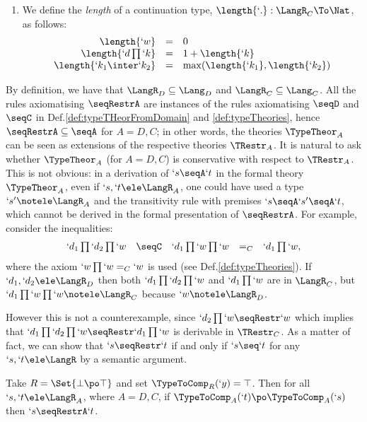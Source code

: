 \documentclass{lmcs}
\def\Steffen#1{}\def\Ugo#1{}\def\Franco#1{}
\begin{document}
\begin{defi}
\begin{enumerate}
 \item
We define the \emph{length} of a continuation type, $ \length{`.} : \LangR_C \To \Nat$, as follows:
%
 \[ \begin{array}{rcl}
\length{`w} &=& 0 \\ 
\length{`d\prod `k} &=& 1+ \length{`k} \\ 
\length{`k_1 \inter`k_2} &=& \max (\length{`k_1} , \length{`k_2})
 \end{array} \]
 \Ugo{Where length is used? I have put this part into comment}
\Steffen{In Theorem {thm:typableAreSN}; a simple find reveals this.}
 \end{enumerate}
 \end{defi}

By definition, we have that $\LangR_D \subseteq \Lang_D$ and $\LangR_C \subseteq \Lang_C$. 
All the rules axiomatising $\seqRestrA$ are instances of the rules axiomatising $\seqD$ and $\seqC$ in Def.\skp\ref{def:typeTHeorFromDomain} and \ref{def:typeTheories}, 
hence ${\seqRestrA} \subseteq {\seqA}$ for $A=D,C$; in other words, the theories $\TypeTheor_A$ can be seen as extensions of the respective theories $\TRestr_A$. 
It is natural to ask whether $\TypeTheor_A$ (for $A=D,C$) is conservative with respect to $\TRestr_A$.
This is not obvious: in a derivation of $`s \seqA `t$ in the formal theory $\TypeTheor_A$, even if $`s,`t \ele \LangR_A$, one could have used a type $`s'\notele \LangR_A$ and the transitivity rule with premises $`s\seqA`s'\seqA`t$, which cannot be derived in the formal presentation of $\seqRestrA$.
For example, consider the inequalities:
%
 \[ \begin{array}{rcl@{\quad}lc}
`d_1\prod `d_2\prod `w &\seqC& `d_1\prod `w\prod `w &=_C& `d_1\prod `w,
 \end{array} \]
where the axiom $`w\prod `w =_C `w$ is used (see Def.\skp\ref{def:typeTheories}).
If $`d_1,`d_2 \ele \LangR_D$ then both $`d_1\prod `d_2\prod `w$ and $`d_1\prod `w$ are in $\LangR_C$, but $ `d_1\prod `w\prod `w\notele \LangR_C$ because $`w\notele \LangR_D$. 

However this is not a counterexample, since $`d_2\prod `w\seqRestr `w$ which implies that $`d_1\prod `d_2\prod `w\seqRestr `d_1\prod `w$ is derivable in $\TRestr_C$.
As a matter of fact, we can show that $`s \seqRestr `t$ if and only if $`s \seq `t$ for any $`s,`t \ele \LangR$ by a semantic argument. 

 \begin{lem} \label{lem:pre-order-restriction}
Take $R = \Set{\bot \po \top}$ and set $\TypeToComp_R(`y) = \top$.
Then for all $`s,`t \ele \LangR_A$, where $A=D,C$, if $\TypeToComp_A(`t) \po \TypeToComp_A(`s)$ then $`s \seqRestrA `t$.
 \end{lem}
\end{document}
